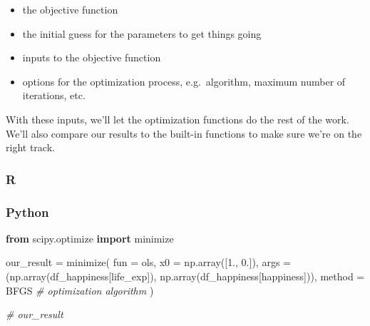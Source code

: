 \documentclass[
  letterpaper,
]{krantz}
\newenvironment{Shaded}{}{}
\newcommand{\AttributeTok}[1]{\textcolor[rgb]{0.49,0.56,0.16}{#1}}
\newcommand{\CommentTok}[1]{\textcolor[rgb]{0.38,0.63,0.69}{\textit{#1}}}
\newcommand{\DecValTok}[1]{\textcolor[rgb]{0.25,0.63,0.44}{#1}}
\newcommand{\FloatTok}[1]{\textcolor[rgb]{0.25,0.63,0.44}{#1}}
\newcommand{\FunctionTok}[1]{\textcolor[rgb]{0.02,0.16,0.49}{#1}}
\newcommand{\ImportTok}[1]{\textcolor[rgb]{0.00,0.50,0.00}{\textbf{#1}}}
\newcommand{\NormalTok}[1]{#1}
\newcommand{\OperatorTok}[1]{\textcolor[rgb]{0.40,0.40,0.40}{#1}}
\newcommand{\OtherTok}[1]{\textcolor[rgb]{0.00,0.44,0.13}{#1}}
\newcommand{\SpecialCharTok}[1]{\textcolor[rgb]{0.25,0.44,0.63}{#1}}
\newcommand{\StringTok}[1]{\textcolor[rgb]{0.25,0.44,0.63}{#1}}
\providecommand{\tightlist}{%
  \setlength{\itemsep}{0pt}\setlength{\parskip}{0pt}}\usepackage{longtable,booktabs,array}
\begin{document}
\begin{itemize}
\tightlist
\item
  the objective function
\item
  the initial guess for the parameters to get things going
\item
  inputs to the objective function
\item
  options for the optimization process, e.g.~algorithm, maximum number
  of iterations, etc.
\end{itemize}

With these inputs, we'll let the optimization functions do the rest of
the work. We'll also compare our results to the built-in functions to
make sure we're on the right track.

\subsubsection{R}

\begin{Shaded}
\end{Shaded}

\subsubsection{Python}

\begin{Shaded}
\begin{Highlighting}[]
\ImportTok{from}\NormalTok{ scipy.optimize }\ImportTok{import}\NormalTok{ minimize}

\NormalTok{our\_result }\OperatorTok{=}\NormalTok{ minimize(}
\NormalTok{    fun    }\OperatorTok{=}\NormalTok{ ols,}
\NormalTok{    x0     }\OperatorTok{=}\NormalTok{ np.array([}\FloatTok{1.}\NormalTok{, }\FloatTok{0.}\NormalTok{]),}
\NormalTok{    args   }\OperatorTok{=}\NormalTok{ (np.array(df\_happiness[}\StringTok{\textquotesingle{}life\_exp\textquotesingle{}}\NormalTok{]), np.array(df\_happiness[}\StringTok{\textquotesingle{}happiness\textquotesingle{}}\NormalTok{])),}
\NormalTok{    method }\OperatorTok{=} \StringTok{\textquotesingle{}BFGS\textquotesingle{}} \CommentTok{\# optimization algorithm}
\NormalTok{)}

\CommentTok{\# our\_result}
\end{Highlighting}
\end{Shaded}
\end{document}
